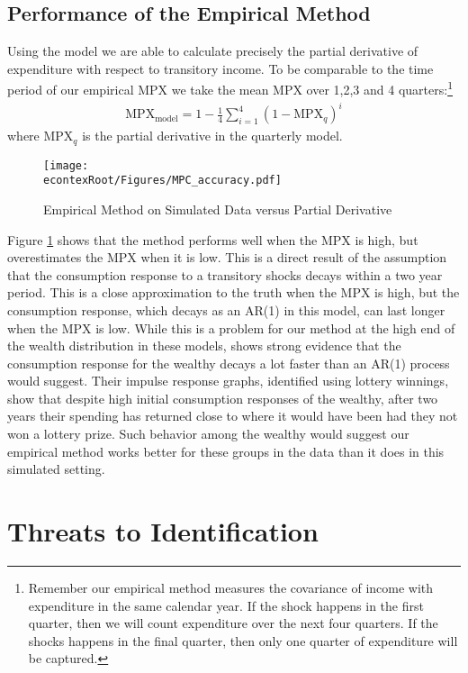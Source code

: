 \documentclass[titlepage]{\econtex}\newcommand{\texname}{ConsumptionHeterogeneity}
\begin{document}
\subsection{Performance of the Empirical Method}
Using the model we are able to calculate precisely the partial derivative of expenditure with respect to transitory income. To be comparable to the time period of our empirical MPX we take the mean MPX over 1,2,3 and 4 quarters:\footnote{Remember our empirical method measures the covariance of income with expenditure in the same calendar year. If the shock happens in the first quarter, then we will count expenditure over the next four quarters. If the shocks happens in the final quarter, then only one quarter of expenditure will be captured.}
\begin{align*}
\text{MPX}_{\text{model}} = 1 - \frac{1}{4}\sum_{i=1}^{4}(1-\text{MPX}_q)^i 
\end{align*}
where $\text{MPX}_q$ is the partial derivative in the quarterly model.
\begin{figure} 
	\begin{centering}
		\texttt{[image: \\econtexRoot/Figures/MPC\_accuracy.pdf]}
		\caption{Empirical Method on Simulated Data versus Partial Derivative}
		\label{fig:MPC_accuracy}
	\end{centering}
\end{figure}

Figure \ref{fig:MPC_accuracy} shows that the method performs well when the MPX is high, but overestimates the MPX when it is low. This is a direct result of the assumption that the consumption response to a transitory shocks decays within a two year period. This is a close approximation to the truth when the MPX is high, but the consumption response, which decays as an AR(1) in this model, can last longer when the MPX is low. While this is a problem for our method at the high end of the wealth distribution in these models, \cite{fagereng_mpc_2016} shows strong evidence that the consumption response for the wealthy decays a lot faster than an AR(1) process would suggest. Their impulse response graphs, identified  using lottery winnings, show that despite high initial consumption responses of the wealthy, after two years their spending has returned close to where it would have been had they not won a lottery prize. Such behavior among the wealthy would suggest our empirical method works better for these groups in the data than it does in this simulated setting.

\section{Threats to Identification}
\end{document}
